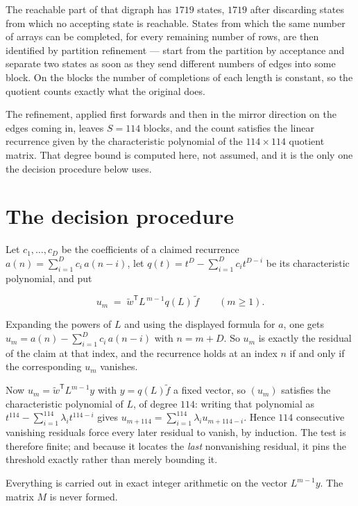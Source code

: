 \documentclass[11pt]{article}
\theoremstyle{definition}
\begin{document}
The reachable part of that digraph has $1719$ states, $1719$ after discarding states from which no accepting state is reachable. States from which the same number of arrays can be completed, for every remaining number of rows, are then identified by partition refinement --- start from the partition by acceptance and separate two states as soon as they send different numbers of edges into some block. On the blocks the number of completions of each length is constant, so the quotient counts exactly what the original does.

The refinement, applied first forwards and then in the mirror direction on the edges coming in, leaves $S = 114$ blocks, and the count satisfies the linear recurrence given by the characteristic polynomial of the $114 \times 114$ quotient matrix. That degree bound is computed here, not assumed, and it is the only one the decision procedure below uses.

\section{The decision procedure}

Let $c_1,\dots,c_D$ be the coefficients of a claimed recurrence $a(n) = \sum_{i=1}^{D} c_i\,a(n-i)$, let $q(t) = t^{D} - \sum_{i=1}^{D} c_i t^{D-i}$ be its characteristic polynomial, and put

\[u_m \;=\; \tilde w^{\mathsf T} L^{\,m-1} q(L)\,\tilde f \qquad (m \ge 1).\]

Expanding the powers of $L$ and using the displayed formula for $a$, one gets $u_m = a(n) - \sum_{i=1}^{D} c_i\,a(n-i)$ with $n = m + D$. So $u_m$ is exactly the residual of the claim at that index, and the recurrence holds at an index $n$ if and only if the corresponding $u_m$ vanishes.

Now $u_m = \tilde w^{\mathsf T} L^{m-1} y$ with $y = q(L)\tilde f$ a fixed vector, so $(u_m)$ satisfies the characteristic polynomial of $L$, of degree $114$: writing that polynomial as $t^{114} - \sum_{i=1}^{114} \lambda_i t^{114-i}$ gives $u_{m+114} = \sum_{i=1}^{114} \lambda_i u_{m+114-i}$. Hence $114$ consecutive vanishing residuals force every later residual to vanish, by induction. The test is therefore finite; and because it locates the {\itshape last} nonvanishing residual, it pins the threshold exactly rather than merely bounding it.

Everything is carried out in exact integer arithmetic on the vector $L^{m-1}y$. The matrix $M$ is never formed.
\end{document}
